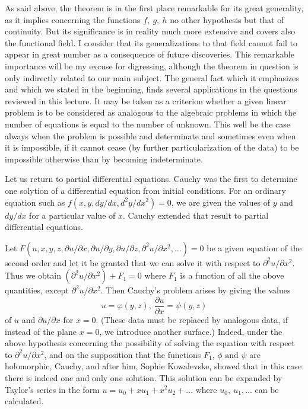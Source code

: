 \documentclass[12pt,oneside]{book}
\begin{document}
As said above, the theorem is in the first place remarkable for its great generality, as it implies concerning the functions $f,\ g,\ h$ no other hypothesis but that of continuity. But its significance is in reality much more extensive and covers also the functional field. I consider that its generalizations to that field cannot fail to appear in great number as a consequence of future discoveries. This remarkable importance will be my excuse for digressing, although the theorem in question is only indirectly related to our main subject. The general fact which it emphasizes and which we stated in the beginning, finds several applications in the questions reviewed in this lecture. It may be taken as a criterion whether a given linear problem is to be considered as analogous to the algebraic problems in which the number of equations is equal to the number of unknown. This well be the case always when the problem is possible and determinate and sometimes even when it is impossible, if it cannot cease (by further particularization of the data) to be impossible otherwise than by becoming indeterminate.\label{pg4} \par 

Let us return to partial differential equations. Cauchy was the first to determine one solytion of a differential equation from initial conditions. For an ordinary equation such as $f(x,y,dy/dx,d^2y/dx^2)=0$, we are given the values of $y$ and $dy/dx$ for a particular value of $x$. Cauchy extended that result to partial differential equations. \par 

Let $F(u,x,y,z,\partial u/\partial x, \partial u/\partial y, \partial u/\partial z,\partial^2u/\partial x^2,\dots)=0$ be a given equation of the second order and let it be granted that we can solve it with respect to $\partial^2u/\partial x^2$. Thus we obtain $(\partial^2u/\partial x^2) + F_1 =0$ where $F_1$ is a function of all the above quantities, except $\partial^2u/\partial x^2$. Then Cauchy's problem arises by giving the values 
\begin{equation}
    \label{eq3}
    u=\varphi (y,z),\ \frac{\partial u}{\partial x}=\psi(y,z)
\end{equation}
of $u$ and $\partial u/\partial x$ for $x=0$. (These data must be replaced by analogous data, if instead of the plane $x=0$, we introduce another surface.) Indeed, under the above hypothesis concerning the possibility of solving the equation with respect to $\partial^2 u/\partial x^2$, and on the supposition that the functions $F_1$, $\phi \text{ and } \psi$ are holomorphic, Cauchy, and after him, Sophie Kowalevske, showed that in this case there is indeed one and only one solution. This solution can be expanded by Taylor's series in the form $u=u_0+xu_1+x^2u_2+ \dots$ where $u_0,\ u_1, \dots$ can be calculated. \par 
\end{document}
